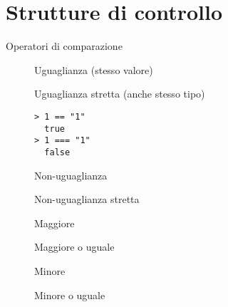 \section{Strutture di controllo}
\begin{frame}[fragile]{Operatori di comparazione}\transfade\centering
  \begin{description}
    \item[\mintjs{==}] Uguaglianza (stesso valore)
    \item[\mintjs{===}] Uguaglianza stretta (anche stesso tipo)\smallskip
\begin{verbatim}
> 1 == "1"
  true
> 1 === "1"
  false
\end{verbatim}
    \pause\smallskip
    \item[\mintjs{!=}] Non-uguaglianza
    \item[\mintjs{!==}] Non-uguaglianza stretta
    \pause\smallskip
    \item[\mintjs{>}] Maggiore
    \item[\mintjs{>=}] Maggiore o uguale
    \item[\mintjs{<}] Minore
    \item[\mintjs{<=}] Minore o uguale
  \end{description}
\end{frame}

